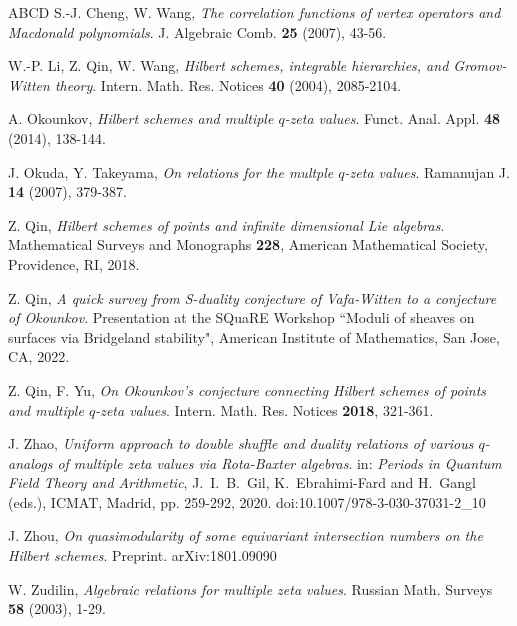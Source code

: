 \documentclass[12pt, reqno]{amsart}
\theoremstyle{definition}
\theoremstyle{remark}
\numberwithin{equation}{section}
\numberwithin{equation}{section}
\begin{document}
\begin{thebibliography}{ABCD}
 S.-J. Cheng, W. Wang,
{\em The correlation functions of vertex operators and Macdonald polynomials}.
J. Algebraic Comb. {\bf 25} (2007), 43-56.

 W.-P. Li, Z. Qin, W. Wang, 
{\em Hilbert schemes, integrable hierarchies, and Gromov-Witten theory}.
Intern. Math. Res. Notices {\bf 40} (2004), 2085-2104.

 A. Okounkov,
{\em Hilbert schemes and multiple $q$-zeta values}. 
Funct. Anal. Appl. {\bf 48} (2014), 138-144.

 J. Okuda, Y. Takeyama,
{\em On relations for the multple $q$-zeta values}. 
Ramanujan J. {\bf 14} (2007), 379-387.

 Z. Qin, 
{\em Hilbert schemes of points and infinite dimensional Lie algebras}.
Mathematical Surveys and Monographs {\bf 228},
American Mathematical Society, Providence, RI, 2018.

 Z. Qin, 
{\em A quick survey from S-duality conjecture of Vafa-Witten to 
a conjecture of Okounkov}. Presentation at the SQuaRE Workshop 
``Moduli of sheaves on surfaces via Bridgeland stability", 
American Institute of Mathematics, San Jose, CA, 2022.

 Z. Qin, F. Yu, 
{\em On Okounkov's conjecture connecting Hilbert schemes of points 
and multiple $q$-zeta values}. Intern. Math. Res. Notices {\bf 2018}, 321-361.

 J. Zhao,
{\em Uniform approach to double shuffle and duality relations of 
various $q$-analogs of multiple zeta values via Rota-Baxter algebras}.
in: \emph{Periods in Quantum Field Theory and Arithmetic},
J.\ I.\ B.\ Gil, K.\ Ebrahimi-Fard and H.\ Gangl (eds.), ICMAT, 
Madrid, pp. 259-292, 2020. doi:10.1007/978-3-030-37031-2\_10

 J. Zhou, 
{\em On quasimodularity of some equivariant intersection numbers 
on the Hilbert schemes}. Preprint. arXiv:1801.09090

 W. Zudilin,
{\em Algebraic relations for multiple zeta values}. 
Russian Math. Surveys {\bf 58} (2003), 1-29.

\end{thebibliography}
\end{document}
